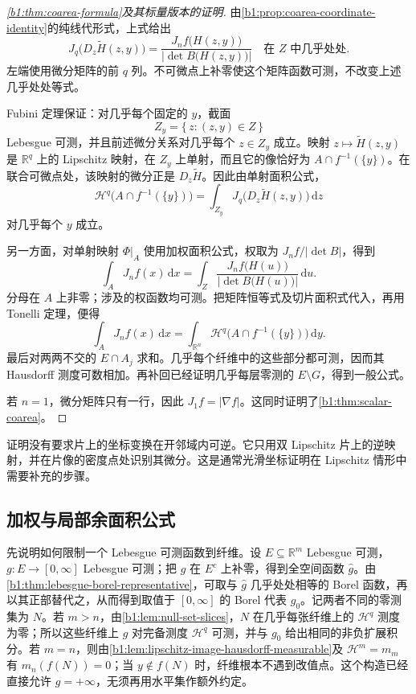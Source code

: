 \begin{proof}[\cref{b1:thm:coarea-formula}及其标量版本的证明]
由\cref{b1:prop:coarea-coordinate-identity}的纯线代形式，上式给出
\[
 J_q\bigl(D_z\widetilde H(z,y)\bigr)
 =
 \frac{J_nf\bigl(H(z,y)\bigr)}
      {|\det B\bigl(H(z,y)\bigr)|}
 \quad\text{在 }Z\text{ 中几乎处处}.
\]
左端使用微分矩阵的前 \(q\) 列。不可微点上补零使这个矩阵函数可测，不改变上述几乎处处等式。

Fubini 定理保证：对几乎每个固定的 \(y\)，截面
\[
 Z_y=\{\,z:(z,y)\in Z\,\}
\]
Lebesgue 可测，并且前述微分关系对几乎每个 \(z\in Z_y\) 成立。映射 \(z\mapsto\widetilde H(z,y)\) 是 \(\mathbb R^q\) 上的 Lipschitz 映射，在 \(Z_y\) 上单射，而且它的像恰好为 \(A\cap f^{-1}(\{y\})\)。在联合可微点处，该映射的微分正是 \(D_z\widetilde H\)。因此由单射面积公式，
\[
 \mathcal H^q\bigl(A\cap f^{-1}(\{y\})\bigr)
 =
 \int_{Z_y}J_q\bigl(D_z\widetilde H(z,y)\bigr)\,\mathrm dz
\]
对几乎每个 \(y\) 成立。

另一方面，对单射映射 \(\Phi|_A\) 使用加权面积公式，权取为 \(J_nf/|\det B|\)，得到
\[
 \int_AJ_nf(x)\,\mathrm dx
 =
 \int_Z
 \frac{J_nf\bigl(H(u)\bigr)}
      {|\det B\bigl(H(u)\bigr)|}\,\mathrm du.
\]
分母在 \(A\) 上非零；涉及的权函数均可测。把矩阵恒等式及切片面积式代入，再用 Tonelli 定理，便得
\[
 \int_AJ_nf(x)\,\mathrm dx
 =
 \int_{\mathbb R^n}\mathcal H^q
                 \bigl(A\cap f^{-1}(\{y\})\bigr)\,\mathrm dy.
\]
最后对两两不交的 \(E\cap A_j\) 求和。几乎每个纤维中的这些部分都可测，因而其 Hausdorff 测度可数相加。再补回已经证明几乎每层零测的 \(E\setminus G\)，得到一般公式。

若 \(n=1\)，微分矩阵只有一行，因此 \(J_1f=|\nabla f|\)。这同时证明了\cref{b1:thm:scalar-coarea}。
\end{proof}

证明没有要求片上的坐标变换在开邻域内可逆。它只用双 Lipschitz 片上的逆映射，并在片像的密度点处识别其微分。这是通常光滑坐标证明在 Lipschitz 情形中需要补充的步骤。

\subsection{加权与局部余面积公式}
\label{b1:subsec:180203}

先说明如何限制一个 Lebesgue 可测函数到纤维。设 \(E\subseteq\mathbb R^m\) Lebesgue 可测，\(g:E\rightarrow[0,\infty]\) Lebesgue 可测；把 \(g\) 在 \(E^c\) 上补零，得到全空间函数 \(\widehat g\)。由\cref{b1:thm:lebesgue-borel-representative}，可取与 \(\widehat g\) 几乎处处相等的 Borel 函数，再以其正部替代之，从而得到取值于 \([0,\infty]\) 的 Borel 代表 \(g_0\)。记两者不同的零测集为 \(N\)。若 \(m>n\)，由\cref{b1:lem:null-set-slices}，\(N\) 在几乎每张纤维上的 \(\mathcal H^q\) 测度为零；所以这些纤维上 \(g\) 对完备测度 \(\mathcal H^q\) 可测，并与 \(g_0\) 给出相同的非负扩展积分。若 \(m=n\)，则由\cref{b1:lem:lipschitz-image-hausdorff-measurable}及 \(\mathcal H^m=m_m\) 有 \(m_n(f(N))=0\)；当 \(y\notin f(N)\) 时，纤维根本不遇到改值点。这个构造已经直接允许 \(g=+\infty\)，无须再用水平集作额外约定。

